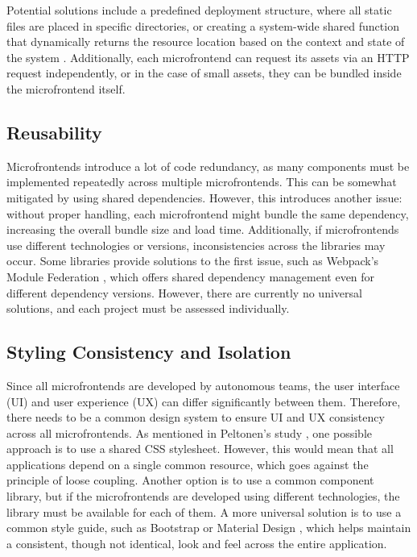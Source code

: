 Potential solutions include a predefined deployment structure, where all static files are placed in specific directories, or creating a system-wide shared function that dynamically returns the resource location based on the context and state of the system \cite{Pavlenko}. Additionally, each microfrontend can request its assets via an HTTP request independently, or in the case of small assets, they can be bundled inside the microfrontend itself.

\subsection{Reusability}
Microfrontends introduce a lot of code redundancy, as many components must be implemented repeatedly across multiple microfrontends. This can be somewhat mitigated by using shared dependencies. However, this introduces another issue: without proper handling, each microfrontend might bundle the same dependency, increasing the overall bundle size and load time. Additionally, if microfrontends use different technologies or versions, inconsistencies across the libraries may occur. Some libraries provide solutions to the first issue, such as Webpack's Module Federation \cite{ModuleFederation}, which offers shared dependency management even for different dependency versions. However, there are currently no universal solutions, and each project must be assessed individually.

\subsection{Styling Consistency and Isolation}
Since all microfrontends are developed by autonomous teams, the user interface (UI) and user experience (UX) can differ significantly between them. Therefore, there needs to be a common design system to ensure UI and UX consistency across all microfrontends. As mentioned in Peltonen's study \cite{Peltonen}, one possible approach is to use a shared CSS stylesheet. However, this would mean that all applications depend on a single common resource, which goes against the principle of loose coupling. Another option is to use a common component library, but if the microfrontends are developed using different technologies, the library must be available for each of them. A more universal solution is to use a common style guide, such as Bootstrap \cite{Bootstrap} or Material Design \cite{MaterialDesign}, which helps maintain a consistent, though not identical, look and feel across the entire application.

